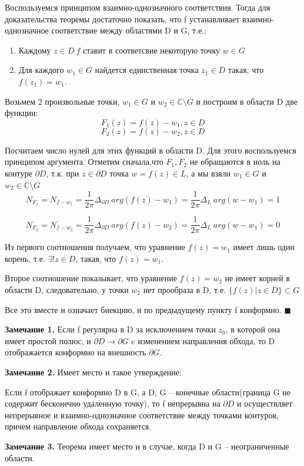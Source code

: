 \documentclass[a4paper, 12pt]{report}
\newenvironment{Proof}
{\par\noindent{\bf Доказательство.}}
{\hfill$\scriptstyle\blacksquare$}
\begin{document}
\begin{Proof}
    Воспользуемся принципом взаимно-однозначного соответствия. Тогда для доказательства теоремы достаточно показать, что f устанавливает взаимно-однозначное соответствие между областями D и G, т.е.:

\begin{enumerate}
    \item Каждому $z\in D \  f$ ставит в соответсвие некоторую точку $w \in G$
    \item Для каждого $w_1 \in G$ найдется единственная точка $z_1 \in D$ такая, что $f(z_1)=w_1$.
\end{enumerate}
\par\bigskip
Возьмем 2 произвольные точки, $w_1 \in G$ и $w_2 \in \mathbb{C}\setminus \overline{G}$ и построим в области D две функции:
$$F_1(z)=f(z)-w_1, z\in D$$
$$F_2(z)=f(z)-w_2, z\in D$$

Посчитаем число нулей для этих функций в области D. Для этого воспользуемся принципом аргумента. Отметим сначала,что $F_1, F_2$ не обращаются в ноль на контуре $\partial D$, т.к. при $z \in \partial D$ точка $w=f(z) \in L$, а мы взяли $w_1 \in G$ и $w_2 \in \mathbb{C}\setminus \overline{G}$
$$N_{F_1}=N_{f-w_1}=\frac1{2\pi} \Delta_{\partial D} \ arg(f(z)-w_1)= \frac1{2\pi} \Delta_L \ arg(w-w_1)=1$$

$$N_{F_2}=N_{f-w_2}=\frac1{2\pi} \Delta_{\partial D} \ arg(f(z)-w_2)= \frac1{2\pi} \Delta_L \ arg(w-w_1)=0$$

Из первого соотношения получаем, что уравнение $f(z)=w_1$ имеет лишь один корень, т.е. $\exists ! z \in D$, такая, что $f(z)=w_1$.

Второе соотношение показывает, что уравнение $f(z)=w_2$ не имеет корней в области D, следовательно, у точки $w_2$ нет прообраза в D, т.е. $\{f(z)|z\in D\}\subset G$

Все это вместе и означает биекцию, и по предыдущему пункту f конформно.
\end{Proof}

\quad\bigskip

\textbf{Замечание 1.} \quad Если f регулярна в D за исключением точки $z_0$, в которой она имеет простой полюс, и $\partial D \to \partial G$ c изменением направления обхода, то D отображается конформно на внешность $\partial G$.
\par\bigskip
\textbf{Замечание 2.} \quad
Имеет место и такое утверждение:\par
Если f отображает конформно D в G, а D, G -- конечные области(граница G не содержит бесконечно удаленную точку), то f непрерывна на $\partial D$ и осуществляет непрерывное и взаимно-однозначное соответствие между точками контуров, причем направление обхода сохраняется.
\par\bigskip
\textbf{Замечание 3.} \quad Теорема имеет место и в случае, когда D и G -- неограниченные области.
\end{document}
